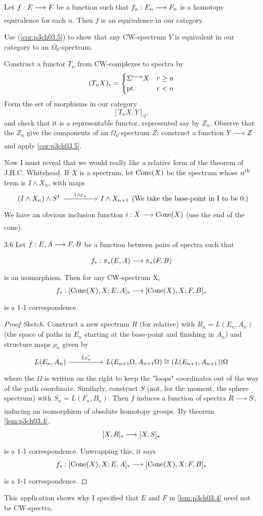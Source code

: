 \documentclass[../main]{subfiles}
\begin{document}
\begin{examples}
Let $f: E\lar{} F$ be a function such that $f_n: E_n\lar{} F_n$ is a
homotopy equivalence for each $n$. Then $f$ is an equivalence in our
category. 
\end{examples}
\begin{exercise}
Use (\ref{cor:p3ch03.5}) to show that any CW-spectrum $Y$ is equivalent in our category to an $\Omega_0$-spectrum.
\end{exercise}
\begin{hint}
Construct a functor $T_n$ from CW-complexes to spectra by \[(T_nX)_r =\begin{cases}\Sigma^{r-n}X & r\geq n\\ \mathrm{pt.} & r<n\end{cases}\]
Form the set of morphisms in our category \[[T_nX,Y]_0,\] and check that it is a representable functor, represented say by $Z_n$. Observe that the $Z_n$ give the components of an $\Omega_0$-spectrum $Z$; construct a function $Y\lar{}Z$ and apply \ref{cor:p3ch03.5}.
\end{hint}

Now I must reveal that we would really like a relative form of the
theorem of J.H.C. Whitehead. If $X$ is a spectrum, let $\mathrm{Cone}(X)$ be
the spectrum whose $n^{\text{th}}$ term is $I\wedge X_n$, with maps
\[\begin{tikzcd}
(I\wedge X_n)\wedge S^1 \arrow[rr, "1\wedge \varepsilon_n"] &  & I\wedge X_{n+1} 
\end{tikzcd} \text{(We take the base-point in I to be 0.)}\] 
We have an obvious inclusion function $i:X\lar{} \te{Cone}(X)$ (use the end of the cone).
\begin{customthm}{3.6}\label{thm:p3ch03.6}
Let $f:E,A\lar{} F,B$ be a function between pairs of spectra such that \[f_\ast:\pi_\ast(E,A)\lar{} \pi_\ast (F,B)\] is an isomorphism. Then for any CW-spectrum X, \[f_\ast:[\te{Cone}(X),X; E,A]_\ast \lar{}[\te{Cone}(X),X; F,B]_\ast\]
is a 1-1 correspondence.
\end{customthm}
\begin{proof}[Proof Sketch]
Construct a new spectrum $R$ (for relative) with $R_n=L(E_n,A_n)$ (the space of paths in $E_n$ starting at the base-point and finishing in $A_n$) and structure maps $\rho_n$ given by 
\[\begin{tikzcd}
{L(E_n,A_n)} \arrow[rr, "L\varepsilon'_n"] &  & {L(E_{n+1} \Omega, A_{n+1} \Omega)\cong (L(E_{n+1},A_{n+1}))\Omega}
\end{tikzcd}  \]
where the $\Omega$ is written on the right to keep the "loops" coordinates out of the way of the path coordinate. Similarly, construct $S$ (not, for the moment, the sphere spectrum) with $S_n=L(F_n,B_n)$. Then $f$ induces a function of spectra $R\lar{} S$, inducing an isomorphism of absolute homotopy groups. By theorem \ref{lem:p3ch03.4}, 
\[[X,R]_\ast \lar{} [X,S]_\star \]
is a 1-1 correspondence. Unwrapping this, it says \[f_\ast:[\te{Cone}(X),X; E,A]_\ast \lar{}[\te{Cone}(X),X; F,B]_\ast\]
is a 1-1 correspondence.
\end{proof}
This application shows why I specified that $E$ and $F$ in \ref{lem:p3ch03.4} need
not be CW-spectra. 
\end{document}
